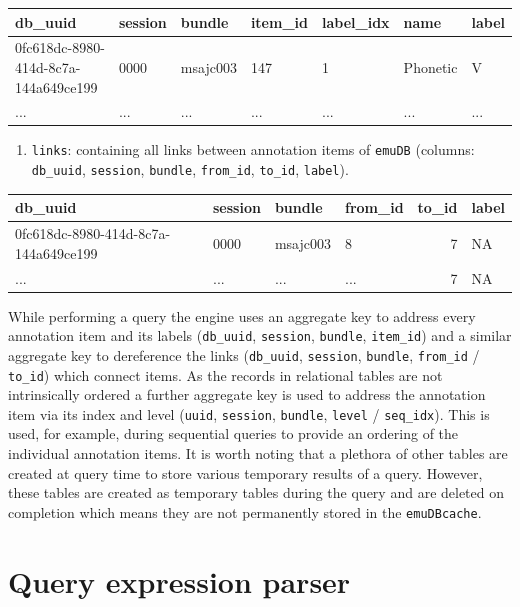 \documentclass[]{book}
\providecommand{\tightlist}{%
  \setlength{\itemsep}{0pt}\setlength{\parskip}{0pt}}
\begin{document}
\begin{tabular}{l|l|l|l|l|l|l}
\hline
db\_uuid & session & bundle & item\_id & label\_idx & name & label\\
\hline
0fc618dc-8980-414d-8c7a-144a649ce199 & 0000 & msajc003 & 147 & 1 & Phonetic & V\\
\hline
... & ... & ... & ... & ... & ... & ...\\
\hline
\end{tabular}

\begin{enumerate}
\def\labelenumi{\arabic{enumi}.}
\setcounter{enumi}{5}
\tightlist
\item
  \texttt{links}: containing all links between annotation items of \texttt{emuDB} (columns: \texttt{db\_uuid}, \texttt{session}, \texttt{bundle}, \texttt{from\_id}, \texttt{to\_id}, \texttt{label}).
\end{enumerate}

\begin{tabular}{l|l|l|l|r|l}
\hline
db\_uuid & session & bundle & from\_id & to\_id & label\\
\hline
0fc618dc-8980-414d-8c7a-144a649ce199 & 0000 & msajc003 & 8 & 7 & NA\\
\hline
... & ... & ... & ... & 7 & NA\\
\hline
\end{tabular}

While performing a query the engine uses an aggregate key to address every annotation item and its labels (\texttt{db\_uuid}, \texttt{session}, \texttt{bundle}, \texttt{item\_id}) and a similar aggregate key to dereference the links (\texttt{db\_uuid}, \texttt{session}, \texttt{bundle}, \texttt{from\_id} / \texttt{to\_id}) which connect items. As the records in relational tables are not intrinsically ordered a further aggregate key is used to address the annotation item via its index and level (\texttt{uuid}, \texttt{session}, \texttt{bundle}, \texttt{level} / \texttt{seq\_idx}). This is used, for example, during sequential queries to provide an ordering of the individual annotation items. It is worth noting that a plethora of other tables are created at query time to store various temporary results of a query. However, these tables are created as temporary tables during the query and are deleted on completion which means they are not permanently stored in the \texttt{emuDBcache}.

\hypertarget{sec:query-queryExpressionParser}{%
\section{Query expression parser}\label{sec:query-queryExpressionParser}}
\end{document}
